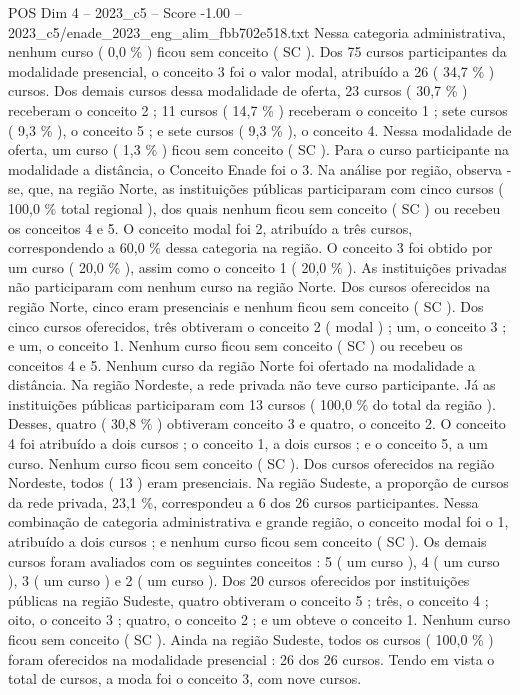 \begin{textsample}{POS Dim 4 – 2023\_c5 – Score -1.00 – 2023\_c5/enade\_2023\_eng\_alim\_fbb702e518.txt}
Nessa categoria administrativa, nenhum curso ( 0,0 \% ) ficou sem conceito ( SC ).
Dos 75 cursos participantes da modalidade presencial, o conceito 3 foi o valor modal, atribuído a 26 ( 34,7 \% ) cursos.
Dos demais cursos dessa modalidade de oferta, 23 cursos ( 30,7 \% ) receberam o conceito 2 ; 11 cursos ( 14,7 \% ) receberam o conceito 1 ; sete cursos ( 9,3 \% ), o conceito 5 ; e sete cursos ( 9,3 \% ), o conceito 4.
Nessa modalidade de oferta, um curso ( 1,3 \% ) ficou sem conceito ( SC ).
Para o curso participante na modalidade a distância, o Conceito Enade foi o 3.
Na análise por região, observa -se, que, na região Norte, as instituições públicas participaram com cinco cursos ( 100,0 \% total regional ), dos quais nenhum ficou sem conceito ( SC ) ou recebeu os conceitos 4 e 5.
O conceito modal foi 2, atribuído a três cursos, correspondendo a 60,0 \% dessa categoria na região.
O conceito 3 foi obtido por um curso ( 20,0 \% ), assim como o conceito 1 ( 20,0 \% ).
As instituições privadas não participaram com nenhum curso na região Norte.
Dos cursos oferecidos na região Norte, cinco eram presenciais e nenhum ficou sem conceito ( SC ).
Dos cinco cursos oferecidos, três obtiveram o conceito 2 ( modal ) ; um, o conceito 3 ; e um, o conceito 1.
Nenhum curso ficou sem conceito ( SC ) ou recebeu os conceitos 4 e 5.
Nenhum curso da região Norte foi ofertado na modalidade a distância.
Na região Nordeste, a rede privada não teve curso participante.
Já as instituições públicas participaram com 13 cursos ( 100,0 \% do total da região ).
Desses, quatro ( 30,8 \% ) obtiveram conceito 3 e quatro, o conceito 2.
O conceito 4 foi atribuído a dois cursos ; o conceito 1, a dois cursos ; e o conceito 5, a um curso.
Nenhum curso ficou sem conceito ( SC ).
Dos cursos oferecidos na região Nordeste, todos ( 13 ) eram presenciais.
Na região Sudeste, a proporção de cursos da rede privada, 23,1 \%, correspondeu a 6 dos 26 cursos participantes.
Nessa combinação de categoria administrativa e grande região, o conceito modal foi o 1, atribuído a dois cursos ; e nenhum curso ficou sem conceito ( SC ).
Os demais cursos foram avaliados com os seguintes conceitos : 5 ( um curso ), 4 ( um curso ), 3 ( um curso ) e 2 ( um curso ).
Dos 20 cursos oferecidos por instituições públicas na região Sudeste, quatro obtiveram o conceito 5 ; três, o conceito 4 ; oito, o conceito 3 ; quatro, o conceito 2 ; e um obteve o conceito 1.
Nenhum curso ficou sem conceito ( SC ).
Ainda na região Sudeste, todos os cursos ( 100,0 \% ) foram oferecidos na modalidade presencial : 26 dos 26 cursos.
Tendo em vista o total de cursos, a moda foi o conceito 3, com nove cursos.

\end{textsample}
